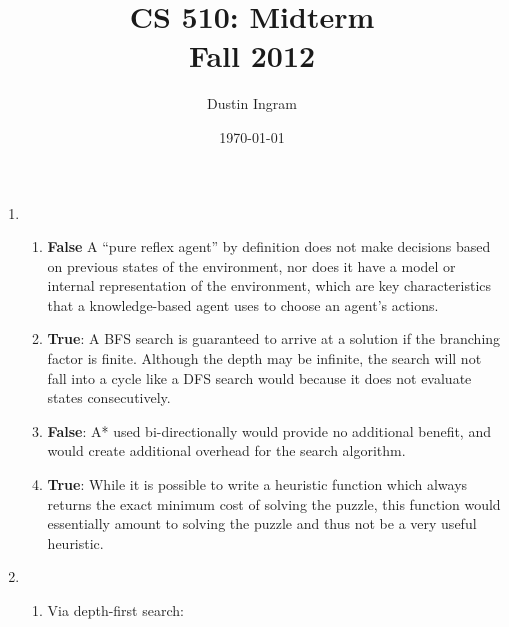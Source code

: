 \documentclass{article}
\title{CS 510: Midterm\\Fall 2012}
\author{Dustin Ingram}
\date{\today}
\begin{document}
\maketitle

\begin{enumerate}

\item{} %

\begin{enumerate}

\item{\textbf{False} A ``pure reflex agent'' by definition does not make
decisions based on previous states of the environment, nor does it have a model
or internal representation of the environment, which are key characteristics
that a knowledge-based agent uses to choose an agent's actions.}

\item{\textbf{True}: A BFS search is guaranteed to arrive at a solution if the
branching factor is finite. Although the depth may be infinite, the search will
not fall into a cycle like a DFS search would because it does not evaluate
states consecutively.}

\item{\textbf{False}: A* used bi-directionally would provide no additional
benefit, and would create additional overhead for the search algorithm.}

\item{\textbf{True}: While it is possible to write a heuristic function which
always returns the exact minimum cost of solving the puzzle, this function
would essentially amount to solving the puzzle and thus not be a very useful 
heuristic.}

\end{enumerate}

\item{} %

\begin{enumerate}

\item{Via depth-first search:}


\end{enumerate}
\end{enumerate}
\end{document}
